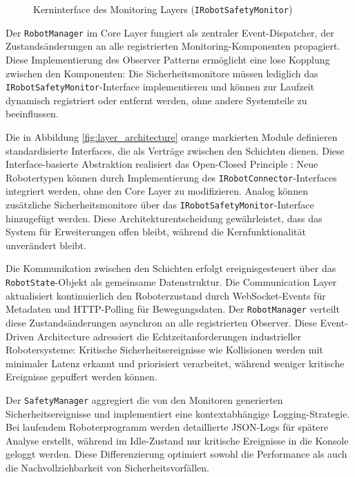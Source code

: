 \begin{figure}[H]
	\inputminted[fontsize=\footnotesize,breaklines]{csharp}{code-snippets/IRobotSafetyMonitor.cs}
	\caption{Kerninterface des Monitoring Layers (\texttt{IRobotSafetyMonitor})}
\end{figure}

Der \texttt{RobotManager} im Core Layer fungiert als zentraler Event-Dispatcher,
der Zustandsänderungen an alle registrierten Monitoring-Komponenten propagiert.
Diese Implementierung des Observer Patterns 
ermöglicht eine lose Kopplung zwischen den Komponenten: Die Sicherheitsmonitore
müssen lediglich das \texttt{IRobotSafetyMonitor}-Interface implementieren und
können zur Laufzeit dynamisch registriert oder entfernt werden, ohne andere
Systemteile zu beeinflussen.

Die in Abbildung \ref{fig:layer_architecture} orange markierten Module
definieren standardisierte Interfaces, die als Verträge zwischen den Schichten
dienen. Diese Interface-basierte Abstraktion realisiert das Open-Closed
Principle : Neue Robotertypen können durch Implementierung
des \texttt{IRobotConnector}-Interfaces integriert werden, ohne den Core Layer
zu modifizieren. Analog können zusätzliche Sicherheitsmonitore über das
\texttt{IRobotSafetyMonitor}-Interface hinzugefügt werden. Diese
Architekturentscheidung gewährleistet, dass das System für Erweiterungen offen
bleibt, während die Kernfunktionalität unverändert bleibt.

Die Kommunikation zwischen den Schichten erfolgt ereignisgesteuert über das
\texttt{RobotState}-Objekt als gemeinsame Datenstruktur. Die Communication Layer
aktualisiert kontinuierlich den Roboterzustand durch WebSocket-Events für
Metadaten und HTTP-Polling für Bewegungsdaten. Der \texttt{RobotManager}
verteilt diese Zustandsänderungen asynchron an alle registrierten Observer.
Diese Event-Driven Architecture  adressiert die
Echtzeitanforderungen industrieller Robotersysteme: Kritische
Sicherheitsereignisse wie Kollisionen werden mit minimaler Latenz erkannt und
priorisiert verarbeitet, während weniger kritische Ereignisse gepuffert werden
können.

Der \texttt{SafetyManager} aggregiert die von den Monitoren generierten
Sicherheitsereignisse und implementiert eine kontextabhängige Logging-Strategie.
Bei laufendem Roboterprogramm werden detaillierte JSON-Logs für spätere Analyse
erstellt, während im Idle-Zustand nur kritische Ereignisse in die Konsole
geloggt werden. Diese Differenzierung optimiert sowohl die Performance als auch
die Nachvollziehbarkeit von Sicherheitsvorfällen.

